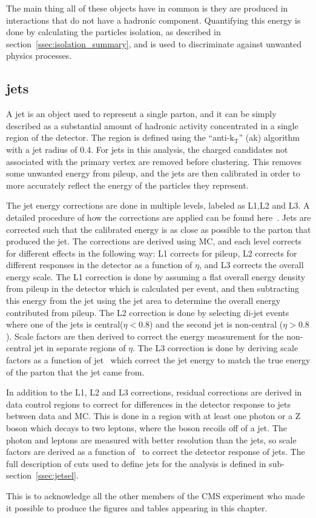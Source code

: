 The main thing all of these objects have in common is they are produced in interactions that do not have a hadronic component.
Quantifying this energy is done by calculating the particles isolation, as described in section~\ref{ssec:isolation_summary},
and is used to discriminate against unwanted physics processes.



\subsection{jets}
\label{ssec:jets}
A jet is an object used to represent a single parton, and it can be simply described as a substantial amount of hadronic activity concentrated in a single region of the detector.
The region is defined using the ``anti-$\mathrm{k_{T}}$'' (ak) algorithm~\cite{antikt} with a jet radius of 0.4.
For jets in this analysis, the charged candidates not associated with the primary vertex are removed before clustering. 
This removes some unwanted energy from pileup, and the jets are then calibrated in order to more accurately reflect the energy of the particles they represent.

The jet energy corrections are done in multiple levels, labeled as L1,L2 and L3.
A detailed procedure of how the corrections are applied can be found here~\cite{CMS-DP-2015-044}.
Jets are corrected such that the calibrated energy is as close as possible to the parton that produced the jet.
The corrections are derived using MC, and each level corrects for different effects in the following way:
L1 corrects for pileup,
L2 corrects for different responses in the detector as a function of $\eta$,
and L3 corrects the overall energy scale.
The L1 correction is done by assuming a flat overall energy density from pileup in the detector which is calculated per event,
and then subtracting this energy from the jet using the jet area to determine the overall energy contributed from pileup.
The L2 correction is done by selecting di-jet events where one of the jets is central($\eta < 0.8$) and the second jet is non-central ($\eta > 0.8$).
Scale factors are then derived to correct the energy measurement for the non-central jet in separate regions of $\eta$.
The L3 correction is done by deriving scale factors as a function of jet \pt\ which correct the jet energy to match the true energy of the parton that the jet came from.

In addition to the L1, L2 and L3 corrections, residual corrections are derived in data control regions to correct for differences in the detector response to jets between data and MC.
This is done in a region with at least one photon or a Z boson which decays to two leptons, where the boson recoils off of a jet.
The photon and leptons are measured with better resolution than the jets, so scale factors are derived as a function of \pt\ to correct the detector response of jets.
The full description of cuts used to define jets for the analysis is defined in sub-section~\ref{ssec:jetsel}.

This is to acknowledge all the other members of the CMS experiment who made it possible to produce
the figures and tables appearing in this chapter.
